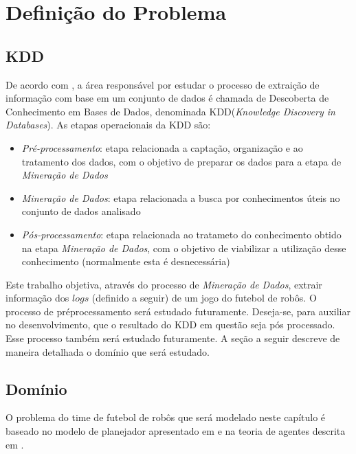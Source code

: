 \chapter{Definição do Problema}\label{cap:def_problema}

\section{KDD}

De acordo com \cite{passos2005datamining}, a área responsável por estudar o processo de extraição de informação com base em um conjunto de dados é
chamada de Descoberta de Conhecimento em Bases de Dados, denominada
KDD(\textit{Knowledge Discovery in Databases}). As etapas operacionais da KDD são:
\begin{itemize}
  \item \textit{Pré-processamento}: etapa relacionada a captação,
        organização e ao tratamento dos dados, com o objetivo de
        preparar os dados para a etapa de \textit{Mineração de Dados}
  \item \textit{Mineração de Dados}: etapa relacionada a busca por
        conhecimentos úteis no conjunto de dados analisado
  \item \textit{Pós-processamento}: etapa relacionada ao tratameto do
        conhecimento obtido na etapa \textit{Mineração de Dados}, com
        o objetivo de viabilizar a utilização desse conhecimento
        (normalmente esta é desnecessária)
\end{itemize}

Este trabalho objetiva, através do processo de \textit{Mineração de Dados}, extrair informação dos $logs$ (definido a seguir)
de um jogo do futebol de robôs. O processo de préprocessamento será estudado futuramente. Deseja-se, para auxiliar
no desenvolvimento, que o resultado do KDD em questão seja pós processado. Esse processo também será estudado futuramente.
A seção a seguir descreve de maneira detalhada o domínio que será estudado.

\section{Domínio}

O problema do time de futebol de robôs que será modelado neste capítulo é baseado no modelo de planejador apresentado em \cite{zickler} e na teoria
de agentes descrita em \cite{russellnorvig}.



